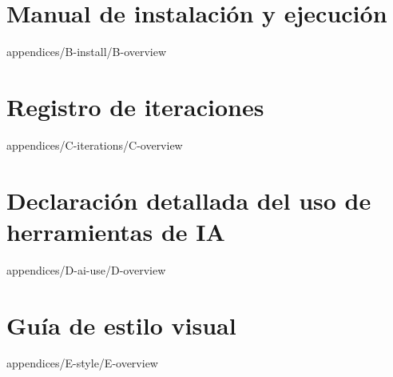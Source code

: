 \documentclass[epsbased,tfg,covers,final,printable,extendedindex,%
               firstnumbered,lof,lot,loc]{tfgtfmthesisuam}
\begin{document}
\chapter{Manual de instalación y ejecución\label{AP:INSTALL}}%
        {appendices/B-install/B-overview}
\chapter{Registro de iteraciones\label{AP:ITERATIONS}}%
        {appendices/C-iterations/C-overview}
\chapter[Declaración detallada de uso de IA]%
        {Declaración detallada del uso de herramientas de
         IA\label{AP:AI}}%
        {appendices/D-ai-use/D-overview}
\chapter{Guía de estilo visual\label{AP:STYLE}}%
        {appendices/E-style/E-overview}
\end{document}
